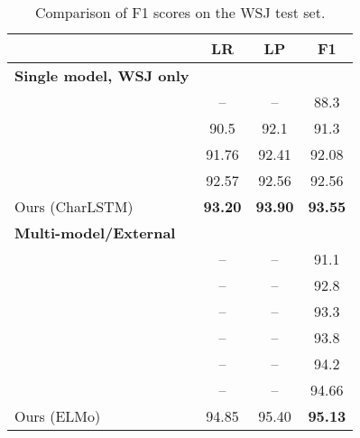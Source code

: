 \documentclass[11pt,a4paper]{article}
\begin{document}
\begin{table}[t!]
\begin{center}
\begin{tabular}{@{}lccc@{}}
\toprule
& LR & LP & F1  \\
\midrule
\textbf{Single model, WSJ only\hspace{-1em}} \\
\addlinespace
\citet{vinyals_grammar_2015} & -- & -- & 88.3\phantom{0} \\
\citet{cross_span-based_2016} & 90.5\phantom{0} & 92.1\phantom{0}  & 91.3\phantom{0} \\
\citet{gaddy_analysis_2018} & 91.76 & 92.41 & 92.08 \\
\citet{stern_effective_2017} & 92.57 & 92.56 & 92.56 \\
Ours (CharLSTM) & \textbf{93.20} &\textbf{93.90} & \textbf{93.55} \\
\addlinespace
\textbf{Multi-model/External} \\
\addlinespace
\citet{durrett_neural_2015} & -- & -- & 91.1\phantom{0} \\
\citet{vinyals_grammar_2015} & -- & -- & 92.8\phantom{0} \\
\citet{dyer_recurrent_2016} & -- & -- & 93.3\phantom{0} \\
\citet{choe_parsing_2016}\hspace{-1em} & -- & -- & 93.8\phantom{0} \\
\citet{liu_in_order_2017} & -- & -- & 94.2\phantom{0} \\
\citet{fried_improving_2017} & -- & -- & 94.66 \\
Ours (ELMo) & 94.85 & 95.40 & \textbf{95.13} \\
\bottomrule
\end{tabular}
\end{center}
\caption{\label{table:wsj-test} Comparison of F1 scores on the WSJ test set.}
\end{table}
\end{document}

